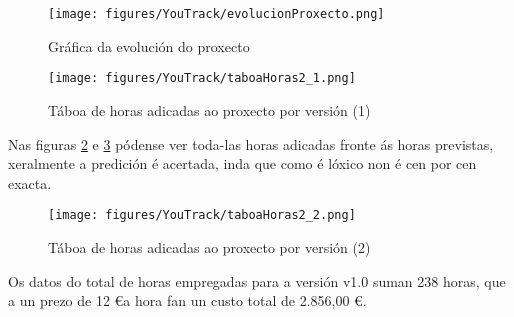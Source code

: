 \begin{figure}[htp]
\begin{center}
    \texttt{[image: figures/YouTrack/evolucionProxecto.png]}
    \caption{Gráfica da evolución do proxecto}
\label{fig:evolucionProxecto}
\end{center}
\end{figure}



\begin{figure}[htp]
\begin{center}
    \texttt{[image: figures/YouTrack/taboaHoras2\_1.png]}
    \caption{Táboa de horas adicadas ao proxecto por versión (1)}
\label{fig:taboaHoras2_1}
\end{center}
\end{figure}

Nas figuras \ref{fig:taboaHoras2_1} e \ref{fig:taboaHoras2_2} pódense ver toda-las horas adicadas 
fronte ás horas previstas, xeralmente a predición é acertada, inda que como é lóxico non é cen por
cen exacta.\\

\begin{figure}[htp]
\begin{center}
    \texttt{[image: figures/YouTrack/taboaHoras2\_2.png]}
    \caption{Táboa de horas adicadas ao proxecto por versión (2)}
\label{fig:taboaHoras2_2}
\end{center}
\end{figure}

Os datos do total de horas empregadas para a versión v1.0 suman 238 horas, que a un prezo de 
12 \euro a hora fan un custo total de 2.856,00 \euro.

